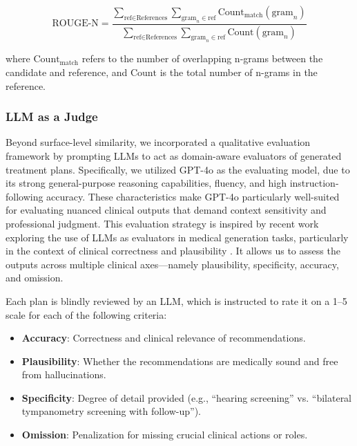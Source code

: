 \documentclass[pdflatex,sn-mathphys-num]{sn-jnl}%
\theoremstyle{thmstyleone}%
\theoremstyle{thmstyletwo}%
\theoremstyle{thmstylethree}%
\begin{document}
\begin{equation}
\text{ROUGE-N} = \frac{\sum_{\text{ref} \in \text{References}} \sum_{\text{gram}_n \in \text{ref}} \text{Count}_{\text{match}}(\text{gram}_n)}{\sum_{\text{ref} \in \text{References}} \sum_{\text{gram}_n \in \text{ref}} \text{Count}(\text{gram}_n)}
\end{equation}

where \( \text{Count}_{\text{match}} \) refers to the number of overlapping n-grams between the candidate and reference, and \( \text{Count} \) is the total number of n-grams in the reference.

\subsubsection{LLM as a Judge}\label{subsec3.6.3}

Beyond surface-level similarity, we incorporated a qualitative evaluation framework by prompting LLMs to act as domain-aware evaluators of generated treatment plans. Specifically, we utilized GPT-4o as the evaluating model, due to its strong general-purpose reasoning capabilities, fluency, and high instruction-following accuracy. These characteristics make GPT-4o particularly well-suited for evaluating nuanced clinical outputs that demand context sensitivity and professional judgment. This evaluation strategy is inspired by recent work exploring the use of LLMs as evaluators in medical generation tasks, particularly in the context of clinical correctness and plausibility \cite{croxford2024human}. It allows us to assess the outputs across multiple clinical axes—namely plausibility, specificity, accuracy, and omission.

Each plan is blindly reviewed by an LLM, which is instructed to rate it on a 1–5 scale for each of the following criteria:

\begin{itemize}
    \item \textbf{Accuracy}: Correctness and clinical relevance of recommendations.
    \item \textbf{Plausibility}: Whether the recommendations are medically sound and free from hallucinations.
    \item \textbf{Specificity}: Degree of detail provided (e.g., “hearing screening” vs. “bilateral tympanometry screening with follow-up”).
    \item \textbf{Omission}: Penalization for missing crucial clinical actions or roles.
\end{itemize}
\end{document}

